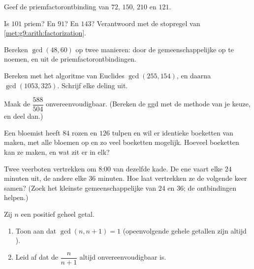 \begin{exercise}[$\star$]\label{exo:g9:arith:3}
Geef de priemfactorontbinding van $72$, $150$, $210$ en $121$.
\end{exercise}

\begin{exercise}[$\star$]\label{exo:g9:arith:4}
Is $101$ priem? En $91$? En $143$? Verantwoord met de stopregel van
\cref{met:g9:arith:factorization}.
\end{exercise}

\begin{exercise}[$\star$]\label{exo:g9:arith:5}
Bereken $\gcd(48, 60)$ op twee manieren: door de gemeenschappelijke  op te
noemen, en uit de priemfactorontbindingen.
\end{exercise}

\begin{exercise}[$\star\star$]\label{exo:g9:arith:6}
Bereken met het algoritme van Euclides $\gcd(255, 154)$, en daarna
$\gcd(1053, 325)$. Schrijf elke deling uit.
\end{exercise}

\begin{exercise}[$\star\star$]\label{exo:g9:arith:7}
Maak de  $\dfrac{588}{504}$ onvereenvoudigbaar. (Bereken de ggd met de
methode van je keuze, en deel dan.)
\end{exercise}

\begin{exercise}[$\star\star$]\label{exo:g9:arith:8}
Een bloemist heeft $84$ rozen en $126$ tulpen en wil er identieke boeketten van
maken, met alle bloemen op en zo veel boeketten mogelijk. Hoeveel boeketten kan
ze maken, en wat zit er in elk?
\end{exercise}

\begin{exercise}[$\star\star$]\label{exo:g9:arith:9}
Twee veerboten vertrekken om 8:00 van dezelfde kade. De ene vaart elke $24$
minuten uit, de andere elke $36$ minuten. Hoe laat vertrekken ze de volgende keer
samen? (Zoek het kleinste gemeenschappelijke  van $24$ en $36$; de
ontbindingen helpen.)
\end{exercise}

\begin{exercise}[$\star\star\star$]\label{exo:g9:arith:10}
Zij $n$ een positief geheel getal.
\begin{enumerate}
  \item Toon aan dat $\gcd(n, n+1) = 1$ (opeenvolgende gehele getallen zijn altijd
        ).
  \item Leid af dat de  $\dfrac{n}{n+1}$ altijd onvereenvoudigbaar is.
\end{enumerate}
\end{exercise}

